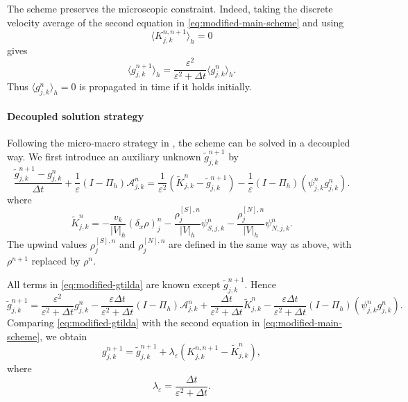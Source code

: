 \documentclass[11pt,twoside]{article}
\numberwithin{equation}{section}
\theoremstyle{plain}
\theoremstyle{nonumberplain}
\begin{document}
{The scheme preserves the microscopic constraint. Indeed, taking the
discrete velocity average of the second equation in
\eqref{eq:modified-main-scheme} and using
\[
\langle K_{j,k}^{n,n+1}\rangle_h=0
\]
gives
\[
\langle g_{j,k}^{n+1}\rangle_h
=
\frac{\varepsilon^2}{\varepsilon^2+\Delta t}
\langle g_{j,k}^{n}\rangle_h .
\]
Thus \(\langle g_{j,k}^{n}\rangle_h=0\) is propagated in time if it holds
initially.

\paragraph{Decoupled solution strategy}
Following the micro-macro strategy in \cite{lemou2008new}, the scheme can
be solved in a decoupled way. We first introduce an auxiliary unknown
\(\widetilde g_{j,k}^{n+1}\) by
\begin{equation}\label{eq:modified-gtilda}
\frac{\widetilde g_{j,k}^{n+1}-g_{j,k}^n}{\Delta t}
+
\frac1\varepsilon
(I-\Pi_h)\mathcal A_{j,k}^n
=
\frac1{\varepsilon^2}
\left(
\widetilde K_{j,k}^{n}
-
\widetilde g_{j,k}^{n+1}
\right)
-
\frac1\varepsilon
(I-\Pi_h)(\psi_{j,k}^n g_{j,k}^n).
\end{equation}
where
\[
\widetilde K_{j,k}^{n}
=
-\frac{v_k}{|V|_h}(\delta_x\rho)_j^{n}
-
\frac{\rho_j^{[S],n}}{|V|_h}\psi_{S,j,k}^n
-
\frac{\rho_j^{[N],n}}{|V|_h}\psi_{N,j,k}^n .
\]
The upwind values \(\rho_j^{[S],n}\) and \(\rho_j^{[N],n}\) are defined in
the same way as above, with \(\rho^{n+1}\) replaced by \(\rho^n\).

All terms in \eqref{eq:modified-gtilda} are known except
\(\widetilde g_{j,k}^{n+1}\). Hence
\[
\widetilde g_{j,k}^{n+1}
=
\frac{\varepsilon^2}{\varepsilon^2+\Delta t}g_{j,k}^n
-
\frac{\varepsilon\Delta t}{\varepsilon^2+\Delta t}
(I-\Pi_h)\mathcal A_{j,k}^n
+
\frac{\Delta t}{\varepsilon^2+\Delta t}
\widetilde K_{j,k}^{n}
-
\frac{\varepsilon\Delta t}{\varepsilon^2+\Delta t}
(I-\Pi_h)(\psi_{j,k}^n g_{j,k}^n).
\]
Comparing \eqref{eq:modified-gtilda} with the second equation in
\eqref{eq:modified-main-scheme}, we obtain
\begin{equation}\label{eq:modified-g-reconstruction}
g_{j,k}^{n+1}
=
\widetilde g_{j,k}^{n+1}
+
\lambda_\varepsilon
\left(
K_{j,k}^{n,n+1}
-
\widetilde K_{j,k}^{n}
\right),
\end{equation}
where
\[
\lambda_\varepsilon
=
\frac{\Delta t}{\varepsilon^2+\Delta t}.
\]

}
\end{document}
